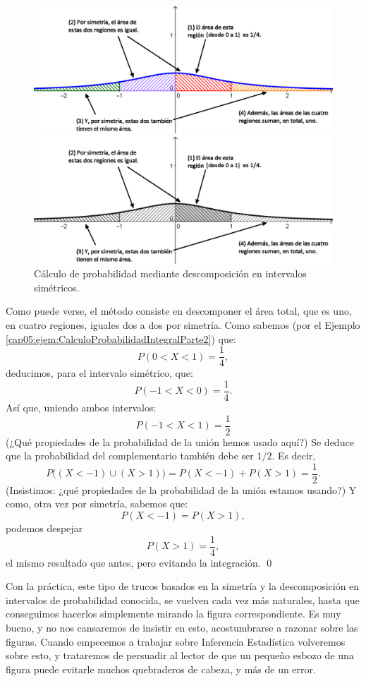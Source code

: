 \begin{ejemplo}
\begin{figure}[htbp]
\begin{center}
\begin{enColor}
\includegraphics[width=12cm]{../fig/Cap05-DistribucionCauchy-TrucosIntegral-rotulado.png}
\end{enColor}
\begin{bn}
\includegraphics[width=12cm]{../fig/Cap05-DistribucionCauchy-TrucosIntegral-rotulado-bn.png}
\end{bn}
\caption{Cálculo de probabilidad mediante descomposición en intervalos simétricos.}
\label{cap05:fig:Cap05-DistribucionCauchy-TrucosIntegral-rotulado-bn.png}
\end{center}
\end{figure}

    Como puede verse, el método consiste en descomponer el área total, que es uno, en cuatro regiones, iguales dos a dos por simetría. Como sabemos (por el Ejemplo \ref{cap05:ejem:CalculoProbabilidadIntegralParte2}) que:
    \[P(0<X<1)=\dfrac{1}{4},\]
    deducimos, para el intervalo simétrico, que:
    \[P(-1<X<0)=\dfrac{1}{4}.\]
    Así que, uniendo ambos intervalos:
    \[P(-1<X<1)=\dfrac{1}{2}\]
    (¿Qué propiedades de la probabilidad de la unión hemos usado aquí?) Se deduce que la probabilidad del complementario también debe ser $1/2$. Es decir,
    \[P\bigl((X<-1)\cup(X>1)\bigr)=P(X<-1)+P(X>1)=\dfrac{1}{2}.\]
    (Insistimos: ¿qué propiedades de la probabilidad de la unión estamos usando?) Y como, otra vez por simetría, sabemos que:
    \[P(X<-1)=P(X>1),\]
    podemos despejar
    \[P(X>1)=\dfrac{1}{4},\]
    el mismo resultado que antes, pero evitando la integración. \qed
\end{ejemplo}
Con la práctica, este tipo de trucos basados en la simetría y la descomposición en intervalos de probabilidad conocida, se vuelven cada vez más naturales, hasta que conseguimos hacerlos simplemente mirando la figura correspondiente. Es muy bueno, y no nos cansaremos de insistir en esto, acostumbrarse a razonar sobre las figuras. Cuando empecemos a trabajar sobre Inferencia Estadística volveremos sobre esto, y trataremos de persuadir al lector de que un pequeño esbozo de una figura puede evitarle muchos quebraderos de cabeza, y más de un error.

